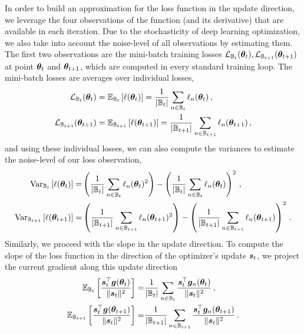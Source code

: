 In order to build an approximation for the loss function in the update
direction, we leverage the four observations of the function (and its
derivative) that are available in each iteration. Due to the stochasticity of
deep learning optimization, we also take into account the noise-level of all
observations by estimating them. The first two observations are the mini-batch
training losses $\mathcal{L}_{{\mathbb{B}}_t}({\bm{\theta}}_t),
\mathcal{L}_{{\mathbb{B}}_{t+1}}({\bm{\theta}}_{t+1})$ at point ${\bm{\theta}}_{t}$ and
${\bm{\theta}}_{t+1}$, which are computed in every standard training loop. The
mini-batch losses are averages over individual losses,
\begin{align*}
  \mathcal{L}_{{\mathbb{B}}_t}({\bm{\theta}}_t)
  &=
    \mathbb{E}_{{\mathbb{B}}_t}\left[ \ell({\bm{\theta}}_t) \right] = \frac{1}{|{\mathbb{B}}_t|} \sum_{n \in {\mathbb{B}}_t}
    \ell_n({\bm{\theta}}_t) \,,
  \\
  \mathcal{L}_{{\mathbb{B}}_{t+1}}({\bm{\theta}}_{t+1})
  &=
    \mathbb{E}_{{\mathbb{B}}_{t+1}}\left[ \ell({\bm{\theta}}_{t+1}) \right] = \frac{1}{|{\mathbb{B}}_{t+1}|} \sum_{n \in {\mathbb{B}}_{t+1}}
    \ell_n({\bm{\theta}}_{t+1})\,,
\end{align*}
and using these individual losses, we can also compute the variances to estimate
the noise-level of our loss observation,
\begin{align*}
  \mathrm{Var}_{{\mathbb{B}}_{t}} \left[ \ell({\bm{\theta}}_t) \right]
  =&
     \left( \frac{1}{|{\mathbb{B}}_t|} \sum_{n \in {\mathbb{B}}_t} \ell_n({\bm{\theta}}_t)^2 \right)
     -
     \left( \frac{1}{|{\mathbb{B}}_t|} \sum_{n \in {\mathbb{B}}_t} \ell_n({\bm{\theta}}_t) \right)^2 \, ,
  \\
  \mathrm{Var}_{{\mathbb{B}}_{t+1}} \left[ \ell({\bm{\theta}}_{t+1}) \right]
  =&
     \left( \frac{1}{|{\mathbb{B}}_{t+1}|} \sum_{n \in {\mathbb{B}}_{t+1}} \ell_n({\bm{\theta}}_{t+1})^2 \right)
     -
     \left( \frac{1}{|{\mathbb{B}}_{t+1}|} \sum_{n \in {\mathbb{B}}_{t+1}} \ell_n({\bm{\theta}}_{t+1}) \right)^2 \, .
\end{align*}
Similarly, we proceed with the slope in the update direction. To compute the
slope of the loss function in the direction of the optimizer's update ${\bm{s}}_t$,
we project the current gradient along this update direction
\begin{align*}
  \mathbb{E}_{{\mathbb{B}}_t} \left[\frac{{\bm{s}}_t^\top {\bm{g}}({\bm{\theta}}_t)}{\lVert {\bm{s}}_t
  \rVert^2}\right]
  =&
     \frac{1}{|{\mathbb{B}}_{t}|} \sum_{n\in {\mathbb{B}}_t} \frac{{\bm{s}}_t^\top {\bm{g}}_n({\bm{\theta}}_t)}{\lVert
     {\bm{s}}_t \rVert^2} \, ,
  \\
  \mathbb{E}_{{\mathbb{B}}_{t+1}} \left[\frac{{\bm{s}}_t^\top {\bm{g}}({\bm{\theta}}_{t+1})}{\lVert {\bm{s}}_t
  \rVert^2}\right]
  =&
     \frac{1}{|{\mathbb{B}}_{t+1}|} \sum_{n\in {\mathbb{B}}_{t+1}} \frac{{\bm{s}}_t^\top {\bm{g}}_n({\bm{\theta}}_{t+1})}{\lVert
     {\bm{s}}_t \rVert^2} \, .
\end{align*}

